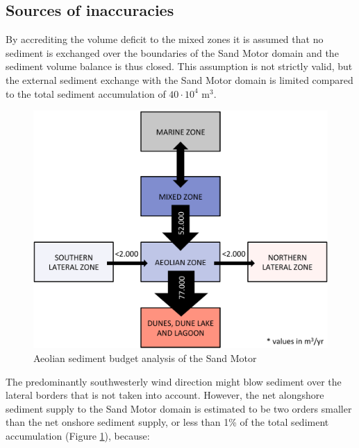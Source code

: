 \subsection{Sources of inaccuracies}

By accrediting the volume deficit to the mixed zones it is assumed
that no sediment is exchanged over the boundaries of the Sand Motor
domain and the sediment volume balance is thus closed. This assumption
is not strictly valid, but the external sediment exchange with the
Sand Motor domain is limited compared to the total sediment
accumulation of $\mathrm{40 \cdot 10^4}$ $\mathrm{m^3}$.

\begin{figure}
  \centering
  \includegraphics[width=\columnwidth]{../Figures/budgets}
  \caption{Aeolian sediment budget analysis of the Sand Motor}
  \label{fig:budgets}
\end{figure}

The predominantly southwesterly wind direction might blow sediment
over the lateral borders that is not taken into account. However, the
net alongshore sediment supply to the Sand Motor domain is estimated
to be two orders smaller than the net onshore sediment supply, or less
than 1\% of the total sediment accumulation (Figure
\ref{fig:budgets}), because:

